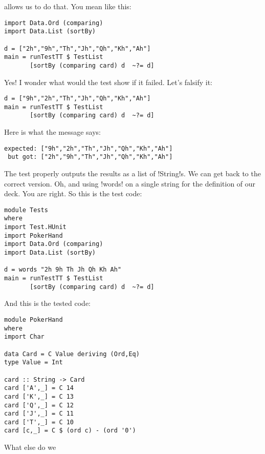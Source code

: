 allows us to do that.
\lhN You mean like this:
\begin{lstlisting}[frame=single]
import Data.Ord (comparing)
import Data.List (sortBy)

d = ["2h","9h","Th","Jh","Qh","Kh","Ah"]
main = runTestTT $ TestList 
       [sortBy (comparing card) d  ~?= d]
\end{lstlisting} %
\hspace*{\fill}
\lhA \success Yes!
\lhN I wonder what would the test show if it failed. Let's falsify it:
\begin{lstlisting}[frame=single]
d = ["9h","2h","Th","Jh","Qh","Kh","Ah"]
main = runTestTT $ TestList 
       [sortBy (comparing card) d  ~?= d]
\end{lstlisting} %
\hspace*{\fill}
\lhA \failure Here is what the message says:
\begin{small}
\begin{verbatim}
expected: ["9h","2h","Th","Jh","Qh","Kh","Ah"]
 but got: ["2h","9h","Th","Jh","Qh","Kh","Ah"]
\end{verbatim}
\end{small}
The test properly outputs the results as a list of \il!String!s. We can get back to the correct version. Oh, and using \il!words! on a single string for the definition of our deck.
\lhN You are right. So this is the test code:
\begin{lstlisting}[frame=single]
module Tests
where 
import Test.HUnit
import PokerHand
import Data.Ord (comparing)
import Data.List (sortBy)

d = words "2h 9h Th Jh Qh Kh Ah"
main = runTestTT $ TestList 
       [sortBy (comparing card) d  ~?= d]
\end{lstlisting} %
\hspace*{\fill}
\lhA And this is the tested code:
\begin{lstlisting}[frame=single]
module PokerHand
where
import Char

data Card = C Value deriving (Ord,Eq)
type Value = Int

card :: String -> Card
card ['A',_] = C 14
card ['K',_] = C 13
card ['Q',_] = C 12
card ['J',_] = C 11
card ['T',_] = C 10
card [c,_] = C $ (ord c) - (ord '0')
\end{lstlisting}
\lhN What else do we 

\lhend
